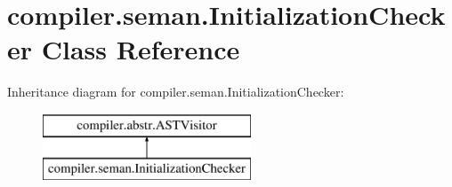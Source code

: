 \hypertarget{classcompiler_1_1seman_1_1_initialization_checker}{}\section{compiler.\+seman.\+Initialization\+Checker Class Reference}
\label{classcompiler_1_1seman_1_1_initialization_checker}
Inheritance diagram for compiler.\+seman.\+Initialization\+Checker\+:\begin{figure}[H]
\begin{center}
\leavevmode
\includegraphics[height=2.000000cm]{classcompiler_1_1seman_1_1_initialization_checker}
\end{center}
\end{figure}
